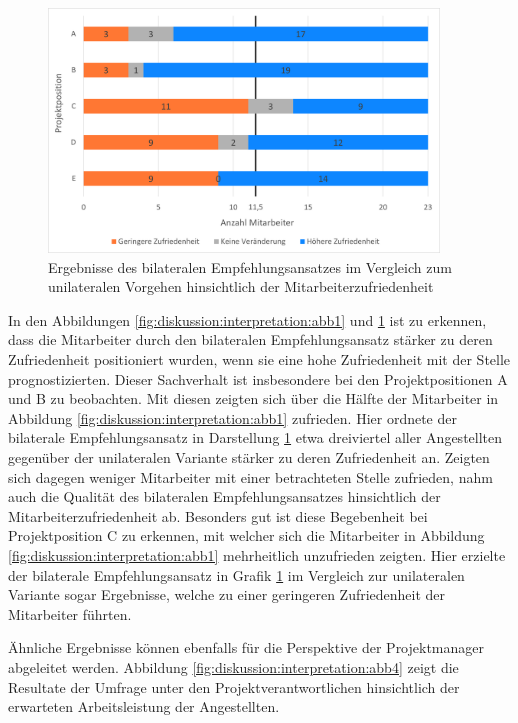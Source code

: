 \begin{figure}[h]
	\centering
	\includegraphics[width=0.925\textwidth]{gfx/zufriedenheit-projekte.png}	
	\caption{Ergebnisse des bilateralen Empfehlungsansatzes im Vergleich zum unilateralen Vorgehen hinsichtlich der Mitarbeiterzufriedenheit}
	\label{fig:diskussion:interpretation:abb3}
\end{figure}

In den Abbildungen \ref{fig:diskussion:interpretation:abb1} und \ref{fig:diskussion:interpretation:abb3} ist zu erkennen, dass die Mitarbeiter durch den bilateralen Empfehlungsansatz stärker zu deren Zufriedenheit positioniert wurden, wenn sie eine hohe Zufriedenheit mit der Stelle prognostizierten. Dieser Sachverhalt ist insbesondere bei den Projektpositionen A und B zu beobachten. Mit diesen zeigten sich über die Hälfte der Mitarbeiter in Abbildung \ref{fig:diskussion:interpretation:abb1} zufrieden. Hier ordnete der bilaterale Empfehlungsansatz in Darstellung \ref{fig:diskussion:interpretation:abb3} etwa dreiviertel aller Angestellten gegenüber der unilateralen Variante stärker zu deren Zufriedenheit an. Zeigten sich dagegen weniger Mitarbeiter mit einer betrachteten Stelle zufrieden, nahm auch die Qualität des bilateralen Empfehlungsansatzes hinsichtlich der Mitarbeiterzufriedenheit ab. Besonders gut ist diese Begebenheit bei Projektposition C zu erkennen, mit welcher sich die Mitarbeiter in Abbildung \ref{fig:diskussion:interpretation:abb1} mehrheitlich unzufrieden zeigten. Hier erzielte der bilaterale Empfehlungsansatz in Grafik \ref{fig:diskussion:interpretation:abb3} im Vergleich zur unilateralen Variante sogar Ergebnisse, welche zu einer geringeren Zufriedenheit der Mitarbeiter führten.

Ähnliche Ergebnisse können ebenfalls für die Perspektive der Projektmanager abgeleitet werden. Abbildung \ref{fig:diskussion:interpretation:abb4} zeigt die Resultate der Umfrage unter den Projektverantwortlichen hinsichtlich der erwarteten Arbeitsleistung der Angestellten.

